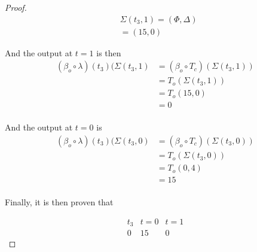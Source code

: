\documentclass{article}
\begin{document}
\begin{proof}
	\begin{align*}
		& \Sigma(t_{3}, 1) = (\Phi, \Delta) \\
		& = (15, 0)
	\end{align*}

	And the output at \(t = 1\) is then 
	\begin{align*}
		(\beta_{o} \circ \lambda)(t_{3})(\Sigma(t_{3}, 1) &= (\beta_{o} \circ T_{c})(\Sigma(t_{3}, 1)) \\
		& = T_{o}(\Sigma(t_{3}, 1)) \\ 
		& = T_{o}(15, 0) \\ 
		& = 0 \\ 
	\end{align*}

	And the output at \(t = 0\) is 
	\begin{align*}
		(\beta_{o} \circ \lambda)(t_{3})(\Sigma(t_{3}, 0) &= (\beta_{o} \circ T_{c})(\Sigma(t_{3}, 0)) \\
		& = T_{o}(\Sigma(t_{3}, 0)) \\ 
		& = T_{o}(0, 4) \\ 
		& = 15 \\ 	
	\end{align*}

	Finally, it is then proven that

	\begin{displaymath}
		\begin{array}{|c|c|c|}
		t_{3} & t = 0 & t = 1\\
 		\hline
		0 & 15 & 0
 		\end{array}
	\end{displaymath}

	
\end{proof}
\end{document}
